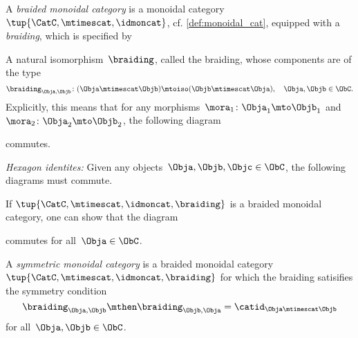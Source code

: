 \begin{ctdefinition}
    \label{def:braided_moncat}
    A \emph{braided monoidal category} is a monoidal category~$\tup{\CatC,\mtimescat,\idmoncat}$,  cf. \cref{def:monoidal_cat}, equipped with a \emph{braiding}, which is specified by

    \constit
    \begin{compactenum}
        \item A natural isomorphism~$\braiding$, called the braiding, whose components are of the type
        \begin{equation}
            \label{eq:braiding_symmetry}
            \braiding_{\Obja,\Objb}\colon (\Obja\mtimescat \Objb)\mtoiso (\Objb\mtimescat \Obja), \quad \Obja,\Objb \in \ObC.
        \end{equation}
        Explicitly, this means that for any morphisms~$\mora_1\colon \Obja_1\mto \Objb_1$ and~$\mora_2\colon \Obja_2\mto \Objb_2$, the following diagram
        \begin{center}
        \end{center}
        commutes.
    \end{compactenum}

    \condit
    \begin{compactenum}
        \item \emph{Hexagon identites:} Given any objects~$\Obja,\Objb,\Objc\in \ObC$, the following diagrams must commute.
    \end{compactenum}
    \begin{center}
    \end{center}
    \begin{center}
    \end{center}
\end{ctdefinition}

\begin{remark}
    If $\tup{\CatC,\mtimescat,\idmoncat, \braiding}$ is a braided monoidal category, one can show that the diagram
    \begin{center}
    \end{center}
    commutes for all~$\Obja \in \ObC$.
\end{remark}

\begin{ctdefinition}
    \label{def:sym-mon-cat}
    A \emph{symmetric monoidal category} is a braided monoidal category~$\tup{\CatC,\mtimescat,\idmoncat, \braiding}$ for which the braiding satisifies the symmetry condition
    \begin{equation}
        \label{eq:braiding-symmetry}
        \braiding_{\Obja,\Objb} \mthen \braiding_{\Objb,\Obja} = \catid_{\Obja \mtimescat \Objb}
    \end{equation}
    for all~$\Obja, \Objb \in \ObC$.
\end{ctdefinition}

